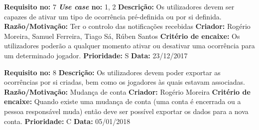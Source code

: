 \begin{framed}
\noindent\textbf{Requisito no:} 7
\qquad
\textbf{\emph{Use case} no:} 1, 2
\vspace{2mm}
\newline\textbf{Descrição:} Os utilizadores devem ser capazes de ativar um tipo de ocorrência pré-definida ou por si definida.
\vspace{1mm}
\newline\textbf{Razão/Motivação:} Ter o controlo das notificações recebidas
\vspace{1mm}
\newline\textbf{Criador:} Rogério Moreira, Samuel Ferreira, Tiago Sá, Rúben Santos
\vspace{1mm}
\newline\textbf{Critério de encaixe:} Os utilizadores poderão a qualquer momento ativar ou desativar uma ocorrência para um determinado jogador.
\vspace{1mm}
\newline\textbf{Prioridade:} S
\vspace{1mm}
\newline\textbf{Data:} 23/12/2017
\end{framed}

\begin{framed}
\noindent\textbf{Requisito no:} 8
\vspace{2mm}
\newline\textbf{Descrição:} Os utilizadores devem poder exportar as ocorrências por si criadas, bem como os jogadores às quais estavam associadas.
\vspace{1mm}
\newline\textbf{Razão/Motivação:} Mudança de conta
\vspace{1mm}
\newline\textbf{Criador:} Rogério Moreira
\vspace{1mm}
\newline\textbf{Critério de encaixe:} Quando existe uma mudança de conta (uma conta é encerrada ou a pessoa responsável muda) então deve ser possível exportar os dados para a nova conta.
\vspace{1mm}
\newline\textbf{Prioridade:} C
\vspace{1mm}
\newline\textbf{Data:} 05/01/2018
\end{framed}

\newpage

